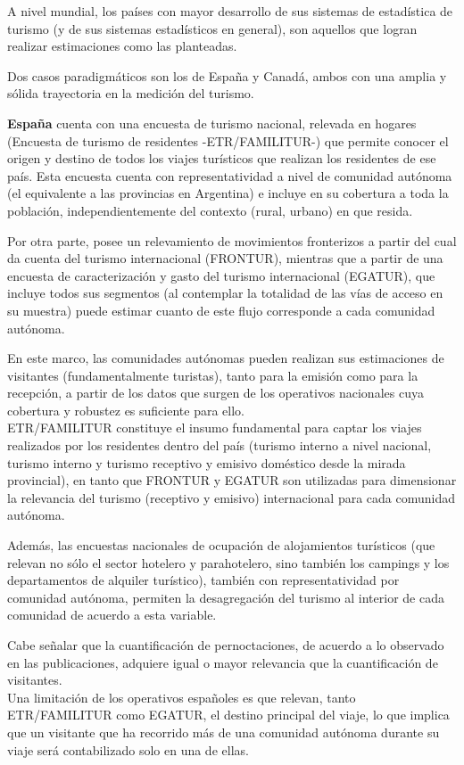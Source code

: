 \documentclass[
]{book}
\begin{document}
A nivel mundial, los países con mayor desarrollo de sus sistemas de estadística de turismo (y de sus sistemas estadísticos en general), son aquellos que logran realizar estimaciones como las planteadas.

Dos casos paradigmáticos son los de España y Canadá, ambos con una amplia y sólida trayectoria en la medición del turismo.

\textbf{España} cuenta con una encuesta de turismo nacional, relevada en hogares (Encuesta de turismo de residentes -ETR/FAMILITUR-) que permite conocer el origen y destino de todos los viajes turísticos que realizan los residentes de ese país. Esta encuesta cuenta con representatividad a nivel de comunidad autónoma (el equivalente a las provincias en Argentina) e incluye en su cobertura a toda la población, independientemente del contexto (rural, urbano) en que resida.

Por otra parte, posee un relevamiento de movimientos fronterizos a partir del cual da cuenta del turismo internacional (FRONTUR), mientras que a partir de una encuesta de caracterización y gasto del turismo internacional (EGATUR), que incluye todos sus segmentos (al contemplar la totalidad de las vías de acceso en su muestra) puede estimar cuanto de este flujo corresponde a cada comunidad autónoma.

En este marco, las comunidades autónomas pueden realizan sus estimaciones de visitantes (fundamentalmente turistas), tanto para la emisión como para la recepción, a partir de los datos que surgen de los operativos nacionales cuya cobertura y robustez es suficiente para ello.\\
ETR/FAMILITUR constituye el insumo fundamental para captar los viajes realizados por los residentes dentro del país (turismo interno a nivel nacional, turismo interno y turismo receptivo y emisivo doméstico desde la mirada provincial), en tanto que FRONTUR y EGATUR son utilizadas para dimensionar la relevancia del turismo (receptivo y emisivo) internacional para cada comunidad autónoma.

Además, las encuestas nacionales de ocupación de alojamientos turísticos (que relevan no sólo el sector hotelero y parahotelero, sino también los campings y los departamentos de alquiler turístico), también con representatividad por comunidad autónoma, permiten la desagregación del turismo al interior de cada comunidad de acuerdo a esta variable.

Cabe señalar que la cuantificación de pernoctaciones, de acuerdo a lo observado en las publicaciones, adquiere igual o mayor relevancia que la cuantificación de visitantes.\\
Una limitación de los operativos españoles es que relevan, tanto ETR/FAMILITUR como EGATUR, el destino principal del viaje, lo que implica que un visitante que ha recorrido más de una comunidad autónoma durante su viaje será contabilizado solo en una de ellas.
\end{document}

